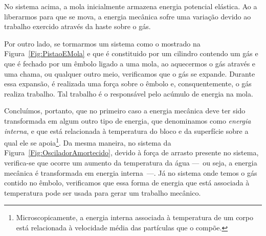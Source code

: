 \begin{marginfigure}
\centering
{}
\caption{No sistema acima, a mola inicialmente armazena energia potencial elástica. Ao a liberarmos para que se mova, a energia mecânica sofre uma variação devido ao trabalho exercido através da haste sobre o gás.\label{Fig:PistaoEMola}}
\end{marginfigure}

Por outro lado, se tormarmos um sistema como o mostrado na Figura~\ref{Fig:PistaoEMola} e que é constituido por um cilindro contendo um gás e que é fechado por um êmbolo ligado a uma mola, ao aquecermos o gás através e uma chama, ou qualquer outro meio, verificamos que o gás se expande. Durante essa expansão, é realizada uma força sobre o êmbolo e, consquentemente, o gás realiza trabalho. Tal trabalho é o responsável pelo acúmulo de energia na mola.

Concluímos, portanto, que no primeiro caso a energia mecânica deve ter sido transformada em algum outro tipo de energia, que denominamos como \emph{energia interna}, e que está relacionada à temperatura do bloco e da superfície sobre a qual ele se apoia\footnote{Microscopicamente, a energia interna associada à temperatura de um corpo está relacionada à velocidade média das partículas que o compõe.}. Da mesma maneira, no sistema da Figura~\ref{Fig:OsciladorAmortecido}, devido à força de arrasto presente no sistema, verifica-se que ocorre um aumento da temperatura da água ---~ou seja, a energia mecânica é transformada em energia interna~---. Já no sistema onde temos o gás contido no êmbolo, verificamos que essa forma de energia que  está associada à temperatura pode ser usada para gerar um trabalho mecânico.

